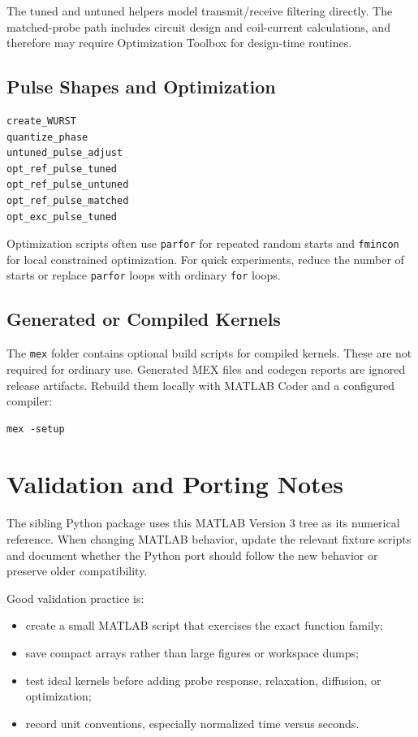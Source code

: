\documentclass[11pt,oneside]{report}
\newcommand{\code}[1]{\texttt{#1}}
\begin{document}
The tuned and untuned helpers model transmit/receive filtering directly. The
matched-probe path includes circuit design and coil-current calculations, and
therefore may require Optimization Toolbox for design-time routines.

\section{Pulse Shapes and Optimization}

\begin{lstlisting}
create_WURST
quantize_phase
untuned_pulse_adjust
opt_ref_pulse_tuned
opt_ref_pulse_untuned
opt_ref_pulse_matched
opt_exc_pulse_tuned
\end{lstlisting}

Optimization scripts often use \code{parfor} for repeated random starts and
\code{fmincon} for local constrained optimization. For quick experiments,
reduce the number of starts or replace \code{parfor} loops with ordinary
\code{for} loops.

\section{Generated or Compiled Kernels}

The \code{mex} folder contains optional build scripts for compiled kernels.
These are not required for ordinary use. Generated MEX files and codegen
reports are ignored release artifacts. Rebuild them locally with MATLAB Coder
and a configured compiler:

\begin{lstlisting}
mex -setup
\end{lstlisting}

\chapter{Validation and Porting Notes}

The sibling Python package uses this MATLAB Version 3 tree as its numerical
reference. When changing MATLAB behavior, update the relevant fixture scripts
and document whether the Python port should follow the new behavior or preserve
older compatibility.

Good validation practice is:

\begin{itemize}
  \item create a small MATLAB script that exercises the exact function family;
  \item save compact arrays rather than large figures or workspace dumps;
  \item test ideal kernels before adding probe response, relaxation, diffusion,
  or optimization;
  \item record unit conventions, especially normalized time versus seconds.
\end{itemize}
\end{document}
